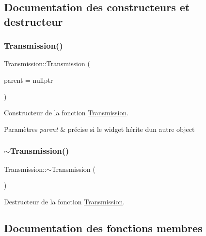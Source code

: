 \subsection{Documentation des constructeurs et destructeur}
\mbox{\label{classTransmission_a1d8087d2d09b9ddd4fd6e8261daed9f3}} 
\subsubsection{\texorpdfstring{Transmission()}{Transmission()}}
{\footnotesize\ttfamily Transmission\+::\+Transmission (\begin{DoxyParamCaption}\item[{Q\+Object $\ast$}]{parent = {\ttfamily nullptr} }\end{DoxyParamCaption})\hspace{0.3cm}{\ttfamily [explicit]}}



Constructeur de la fonction \hyperlink{classTransmission}{Transmission}. 


\begin{DoxyParams}{Paramètres}
{\em parent} & précise si le widget hérite d\textquotesingle{}un autre object \\
\hline
\end{DoxyParams}
\mbox{\label{classTransmission_adcdc6012d99ddb1d0c3159d50984e146}} 
\subsubsection{\texorpdfstring{$\sim$\+Transmission()}{~Transmission()}}
{\footnotesize\ttfamily Transmission\+::$\sim$\+Transmission (\begin{DoxyParamCaption}{ }\end{DoxyParamCaption})}



Destructeur de la fonction \hyperlink{classTransmission}{Transmission}. 



\subsection{Documentation des fonctions membres}
\mbox{\label{classTransmission_a14b885539e973a158c9c4c25fd99bc04}} 

